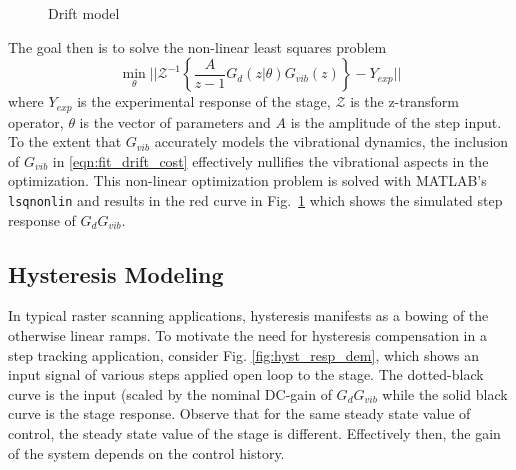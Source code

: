 \documentclass[journal,twocolumn,twoside]{IEEEtran}
\begin{document}
\begin{figure}
  
  \caption{Drift model}
  \label{fig:drift_fit}
\end{figure}
The goal then is to solve the non-linear least squares problem
\begin{equation}
  \min_{\theta}|| \mathcal{Z}^{-1}\left\{ \frac{A}{z-1}G_d(z|\theta)G_{vib}(z)\right\} - Y_{exp}||
  \label{eqn:fit_drift_cost}
\end{equation}
where $Y_{exp}$ is the experimental response of the stage, $\mathcal{Z}$ is the z-transform operator, $\theta$ is the vector of parameters and $A$ is the amplitude of the step input. To the extent that $G_{vib}$ accurately models the vibrational dynamics, the inclusion of $G_{vib}$ in \eqref{eqn:fit_drift_cost} effectively nullifies the vibrational aspects in the optimization.
This non-linear optimization problem is solved with MATLAB's \texttt{lsqnonlin} and results in the red curve in Fig.~\ref{fig:drift_fit} which shows the simulated step response of $G_dG_{vib}$. 


\subsection{Hysteresis Modeling}\label{sec:hyst_model}
In typical raster scanning applications, hysteresis manifests as a bowing of the otherwise linear ramps. To motivate the need for hysteresis compensation in a step tracking application, consider Fig. \ref{fig:hyst_resp_dem}, which shows an input signal of various steps applied open loop to the stage. The dotted-black curve is the input (scaled by the nominal DC-gain of $G_dG_{vib}$ while the solid black curve is the stage response. Observe that for the same steady state value of control, the steady state value of the stage is different. Effectively then, the gain of the system depends on the control history.
\end{document}
